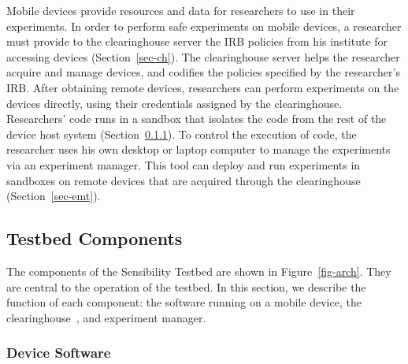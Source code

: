 Mobile devices
provide resources and data for researchers to use in their
experiments. In order to perform safe experiments on mobile
devices, a researcher must provide to the clearinghouse server
the IRB policies from his institute for accessing devices 
(Section~\ref{sec-ch}).  
The clearinghouse server helps the researcher acquire and manage
devices, and codifies the policies specified by the
researcher's IRB. 
After obtaining remote devices, researchers can perform
experiments on the devices directly, using their credentials assigned by
the clearinghouse. Researchers' code runs in a sandbox 
that isolates the code from the rest of the device
host system (Section~\ref{sec-repy}). To control the execution of 
code, the researcher uses his own desktop or laptop computer to manage the 
experiments via an experiment manager. This tool can deploy 
and run experiments in sandboxes on remote devices that are 
acquired through the clearinghouse (Section~\ref{sec-emt}).



\subsection{Testbed Components}\label{sec-component}

The components of the Sensibility Testbed are shown in Figure~\ref{fig-arch}.
They are central to the operation of the testbed. 
In this section, we describe the function of each component: the
software running on a mobile device, the clearinghouse~\cite{ch}, 
and experiment manager.

\subsubsection{Device Software}\label{sec-repy}

